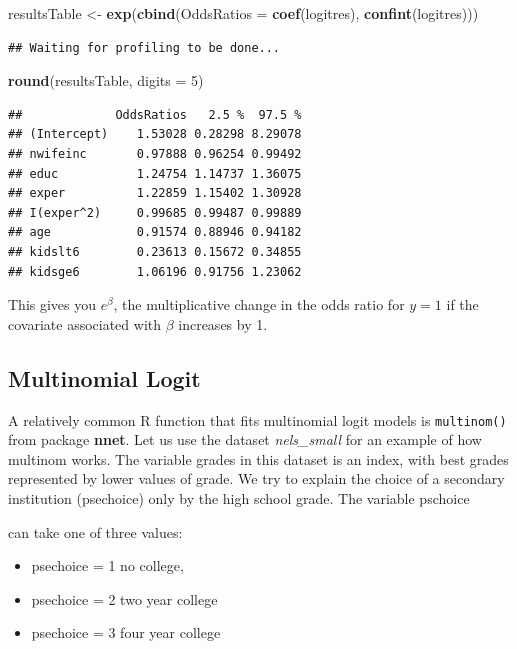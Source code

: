\documentclass[]{book}
\newenvironment{Shaded}{\begin{snugshade}}{\end{snugshade}}
\newcommand{\DataTypeTok}[1]{\textcolor[rgb]{0.13,0.29,0.53}{#1}}
\newcommand{\DecValTok}[1]{\textcolor[rgb]{0.00,0.00,0.81}{#1}}
\newcommand{\KeywordTok}[1]{\textcolor[rgb]{0.13,0.29,0.53}{\textbf{#1}}}
\newcommand{\NormalTok}[1]{#1}
\newcommand{\StringTok}[1]{\textcolor[rgb]{0.31,0.60,0.02}{#1}}
\providecommand{\tightlist}{%
  \setlength{\itemsep}{0pt}\setlength{\parskip}{0pt}}
\begin{document}
\begin{Shaded}
\begin{Highlighting}[]
\NormalTok{resultsTable <-}\StringTok{ }\KeywordTok{exp}\NormalTok{(}\KeywordTok{cbind}\NormalTok{(}\DataTypeTok{OddsRatios =} \KeywordTok{coef}\NormalTok{(logitres), }\KeywordTok{confint}\NormalTok{(logitres)))}
\end{Highlighting}
\end{Shaded}

\begin{verbatim}
## Waiting for profiling to be done...
\end{verbatim}

\begin{Shaded}
\begin{Highlighting}[]
\KeywordTok{round}\NormalTok{(resultsTable, }\DataTypeTok{digits =} \DecValTok{5}\NormalTok{)}
\end{Highlighting}
\end{Shaded}

\begin{verbatim}
##             OddsRatios   2.5 %  97.5 %
## (Intercept)    1.53028 0.28298 8.29078
## nwifeinc       0.97888 0.96254 0.99492
## educ           1.24754 1.14737 1.36075
## exper          1.22859 1.15402 1.30928
## I(exper^2)     0.99685 0.99487 0.99889
## age            0.91574 0.88946 0.94182
## kidslt6        0.23613 0.15672 0.34855
## kidsge6        1.06196 0.91756 1.23062
\end{verbatim}

This gives you \(e^\beta\), the multiplicative change in the odds ratio for \(y=1\) if the covariate associated with \(\beta\) increases by 1.

\hypertarget{multinomial-logit}{%
\subsection{Multinomial Logit}\label{multinomial-logit}}

A relatively common R function that fits multinomial logit models is \texttt{multinom()} from package \textbf{nnet}. Let us use the dataset \emph{nels\_small} for an example of how multinom works. The variable grades in this dataset is an index, with best grades represented by lower values of grade. We try to explain the choice of a secondary institution (psechoice) only by the high school grade. The variable pschoice

can take one of three values:

\begin{itemize}
\tightlist
\item
  psechoice = 1 no college,
\item
  psechoice = 2 two year college
\item
  psechoice = 3 four year college
\end{itemize}
\end{document}
